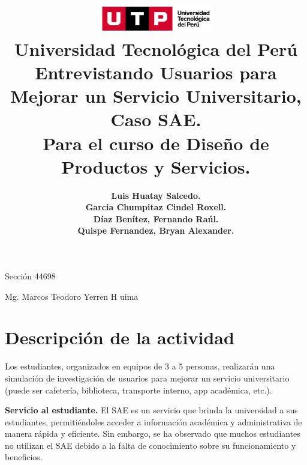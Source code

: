 \documentclass{article}
\title{
  \includegraphics[width=5cm]{./assets/logo-utp.png} \\
  \vspace{1cm}
  \textbf{Universidad Tecnológica del Perú} \\
  \vspace{2cm}
  \textbf{Entrevistando Usuarios para Mejorar un Servicio Universitario, Caso SAE.} \\
  \vspace{1cm}
  \large \textbf{Para el curso de Diseño de Productos y Servicios.}
}
\author{
  \textbf{Luis Huatay Salcedo.} \\
  \textbf{Garcia Chumpitaz Cindel Roxell.} \\
  \textbf{Díaz Benítez, Fernando Raúl.} \\
  \textbf{Quispe Fernandez, Bryan Alexander.}
}
\begin{document}
\maketitle
\begin{center}
  Sección 44698
\end{center}
\thispagestyle{empty}
\begin{center}
  Mg. Marcos Teodoro Yerren H uima  
\end{center}
\restoregeometry




\newpage
\section*{Descripción de la actividad}

Los estudiantes, organizados en equipos de 3 a 5 personas, realizarán una simulación de investigación de usuarios para mejorar un servicio universitario (puede ser cafetería, biblioteca, transporte interno, app académica, etc.).

\textbf{Servicio al estudiante.} El SAE es un servicio que brinda la universidad a sus estudiantes, permitiéndoles acceder a información académica y administrativa de manera rápida y eficiente. Sin embargo, se ha observado que muchos estudiantes no utilizan el SAE debido a la falta de conocimiento sobre su funcionamiento y beneficios.
\end{document}
